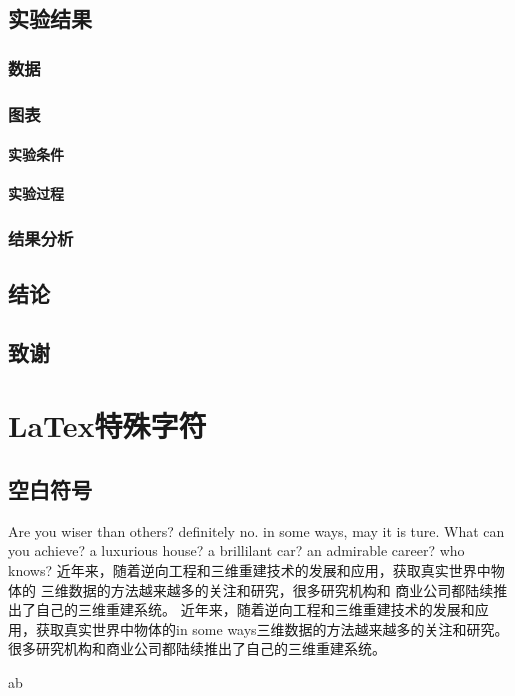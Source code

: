 \documentclass[12pt]{ctexbook}  %
\begin{document}
	\section{实验结果}
	\subsection{数据}
	\subsection{图表}
	\subsubsection{实验条件}
	\subsubsection{实验过程}
	\subsection{结果分析}
	\section{结论}
	\section{致谢}
	
	\chapter{LaTex特殊字符}
	\section{空白符号}
	Are you wiser          than others? definitely no. in some ways, may it is ture. What can you achieve? a luxurious house? a brillilant car? an admirable career? who knows?
	近年来，随着逆向工程和三维重建技术的发展和应用，获取真实世界中物体的         三维数据的方法越来越多的关注和研究，很多研究机构和      商业公司都陆续推出了自己的三维重建系统。
	近年来，随着逆向工程和三维重建技术的发展和应用，获取真实世界中物体的in some ways三维数据的方法越来越多的关注和研究。很多研究机构和商业公司都陆续推出了自己的三维重建系统。
	
	a\quad b
	
\end{document}
